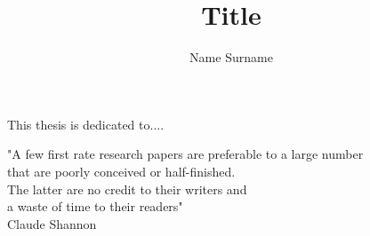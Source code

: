 \documentclass[a4,10pt,twoside,openright,italian,english]{book}%
\author{Name Surname}
\title{Title}
\begin{document}

\maketitle

\pagestyle{empty}

\cleardoublepage
\newpage

\thispagestyle{empty}
    \null{}
        \begin{flushright}
                This thesis is dedicated to....
        \end{flushright}
\null

\cleardoublepage
\newpage

\pagestyle{empty}

\thispagestyle{empty}
    \null{}
        \begin{flushright}
                "A few first rate research papers are preferable to a large number \\
                that are poorly conceived or half-finished.\\
                The latter are no credit to their writers and \\
                a waste of time to their readers"\\
                Claude Shannon
        \end{flushright}
\null

\cleardoublepage
\newpage

\pagestyle{empty}
\setcounter{page}{1}


\end{document}
